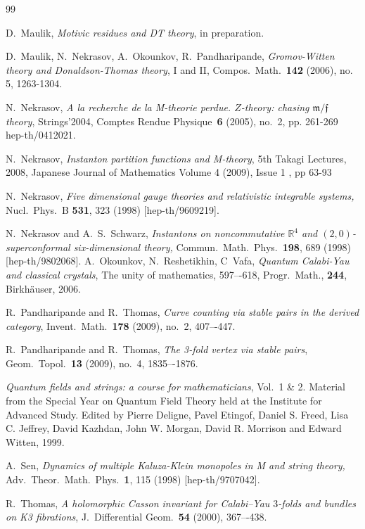 \documentclass[12pt]{article}
\newcommand{\R}{\mathbb{R}}
\theoremstyle{definition}
\begin{document}
\begin{thebibliography}{99}
  
D.~Maulik,
\emph{Motivic residues and DT theory}, 
in preparation. 


D.~Maulik, N.~Nekrasov, A.~Okounkov, R.~Pandharipande, 
\emph{Gromov-Witten theory and Donaldson-Thomas theory}, I and II, 
Compos.\ Math.\  \textbf{142} (2006), no. 5, 1263-1304.

N.~Nekrasov,  
\emph{	
A la recherche de la M-theorie perdue. 
$Z$-theory: chasing  $\mathfrak{m}/\mathfrak{f}$ theory}, 
Strings'2004,
Comptes Rendue Physique\ \textbf{6} (2005), no.~2, pp. 261-269 \\
hep-th/0412021.

N.~Nekrasov, 
\emph{Instanton partition functions and M-theory}, 5th Takagi Lectures,  2008, 
Japanese Journal of Mathematics 
Volume 4 (2009), Issue 1 , pp 63-93 

  N.~Nekrasov,
  \emph{Five dimensional gauge theories and relativistic integrable systems,}
  Nucl.\ Phys.\ B {\bf 531}, 323 (1998)
  [hep-th/9609219].

  N.~Nekrasov and A.~S.~Schwarz,
 \emph{Instantons on noncommutative ${\R}^4$ and $(2,0)$-superconformal six-dimensional theory,}
  Commun.\ Math.\ Phys.\  {\bf 198}, 689 (1998)
  [hep-th/9802068].
A.~Okounkov, N.~Reshetikhin, C~Vafa, 
\emph{Quantum Calabi-Yau and classical crystals}, 
The unity of mathematics, 597–-618, Progr.\ Math., \textbf{244}, 
Birkh\"auser, 2006.

R.~Pandharipande and R.~Thomas, 
\emph{Curve counting via stable pairs in the derived category},
Invent.\ Math.\ \textbf{178} (2009), no.~2, 407–-447. 

R.~Pandharipande and R.~Thomas, 
\emph{The 3-fold vertex via stable pairs}, 
 Geom.\ Topol.\ \textbf{13} (2009), no.~4, 1835–-1876. 

\emph{Quantum fields and strings: a course for mathematicians}, 
Vol.~1 \& 2. Material from the Special Year on Quantum Field Theory
held at the Institute for Advanced Study. Edited by Pierre Deligne, Pavel Etingof, Daniel S. Freed,
Lisa C. Jeffrey, David Kazhdan, John W. Morgan, David R. Morrison and
Edward Witten, 1999. 

  A.~Sen,
  \emph{Dynamics of multiple Kaluza-Klein monopoles in M and string theory,}
  Adv.\ Theor.\ Math.\ Phys.\  {\bf 1}, 115 (1998)
  [hep-th/9707042].

R.~Thomas, 
\emph{A holomorphic Casson invariant for Calabi–Yau $3$-folds and
  bundles on K3 fibrations}, J.~Differential Geom.\ \textbf{54}
(2000), 367–-438. 


\end{thebibliography}
\end{document}
